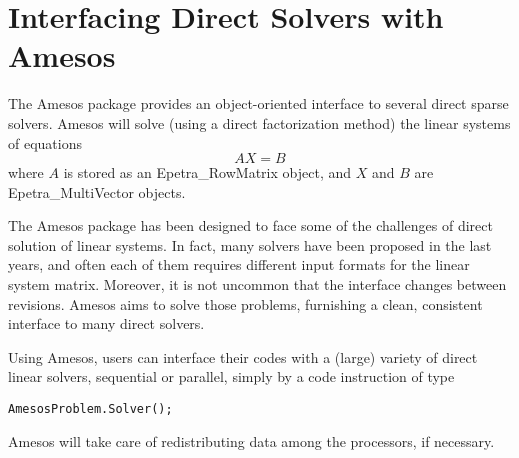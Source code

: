 % 
% 
% 
%  
%  
% 

\section{Interfacing Direct Solvers with Amesos}
\label{chap:amesos}

The Amesos package provides an object-oriented interface to several
direct sparse solvers. Amesos will solve (using a direct factorization
method) the linear systems of equations
\begin{equation}
\label{eq:amesos_ls}
A X = B
\end{equation}
where $A$ is stored as an Epetra\_RowMatrix object, and $X$ and $B$ are
Epetra\_MultiVector objects.

The Amesos package has been designed to face some of the challenges of
direct solution of linear systems. In fact, many solvers have been
proposed in the last years, and often each of them requires different
input formats for the linear system matrix. Moreover, it is not uncommon
that the interface changes between revisions. Amesos aims to solve those
problems, furnishing a clean, consistent interface to many direct
solvers.

Using Amesos, users can interface their codes with a (large) variety of
direct linear solvers, sequential or parallel, simply by a code
instruction of type
\begin{verbatim}
AmesosProblem.Solver();
\end{verbatim}
Amesos will take care of redistributing data among the processors, if
necessary.

